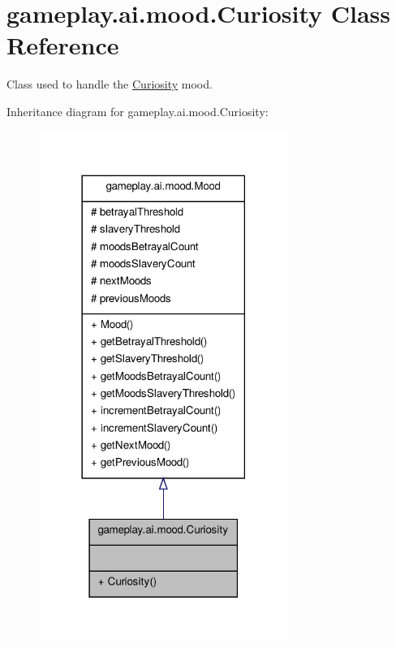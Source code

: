 \hypertarget{a00007}{\section{gameplay.\-ai.\-mood.\-Curiosity Class Reference}
\label{a00007}
}


Class used to handle the \hyperlink{a00007}{Curiosity} mood.  




Inheritance diagram for gameplay.\-ai.\-mood.\-Curiosity\-:
\nopagebreak
\begin{figure}[H]
\begin{center}
\leavevmode
\includegraphics[width=230pt]{a00104}
\end{center}
\end{figure}


